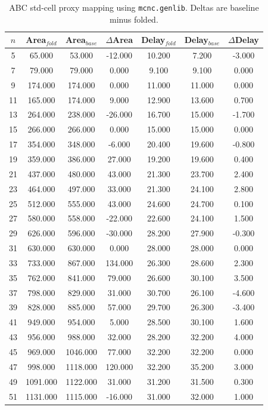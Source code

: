 \begin{table}[t]
\centering
\caption{ABC std-cell proxy mapping using \texttt{mcnc.genlib}. Deltas are baseline minus folded.}
\label{tab:stdcell_mcnc_genlib}
\begin{tabular}{ccccccc}
\hline
$n$ & Area$_{fold}$ & Area$_{base}$ & $\Delta$Area & Delay$_{fold}$ & Delay$_{base}$ & $\Delta$Delay \\
\hline
5 & 65.000 & 53.000 & -12.000 & 10.200 & 7.200 & -3.000 \\
7 & 79.000 & 79.000 & 0.000 & 9.100 & 9.100 & 0.000 \\
9 & 174.000 & 174.000 & 0.000 & 11.000 & 11.000 & 0.000 \\
11 & 165.000 & 174.000 & 9.000 & 12.900 & 13.600 & 0.700 \\
13 & 264.000 & 238.000 & -26.000 & 16.700 & 15.000 & -1.700 \\
15 & 266.000 & 266.000 & 0.000 & 15.000 & 15.000 & 0.000 \\
17 & 354.000 & 348.000 & -6.000 & 20.400 & 19.600 & -0.800 \\
19 & 359.000 & 386.000 & 27.000 & 19.200 & 19.600 & 0.400 \\
21 & 437.000 & 480.000 & 43.000 & 21.300 & 23.700 & 2.400 \\
23 & 464.000 & 497.000 & 33.000 & 21.300 & 24.100 & 2.800 \\
25 & 512.000 & 555.000 & 43.000 & 24.600 & 24.700 & 0.100 \\
27 & 580.000 & 558.000 & -22.000 & 22.600 & 24.100 & 1.500 \\
29 & 626.000 & 596.000 & -30.000 & 28.200 & 27.900 & -0.300 \\
31 & 630.000 & 630.000 & 0.000 & 28.000 & 28.000 & 0.000 \\
33 & 733.000 & 867.000 & 134.000 & 26.300 & 28.600 & 2.300 \\
35 & 762.000 & 841.000 & 79.000 & 26.600 & 30.100 & 3.500 \\
37 & 798.000 & 829.000 & 31.000 & 30.700 & 26.100 & -4.600 \\
39 & 828.000 & 885.000 & 57.000 & 29.700 & 26.300 & -3.400 \\
41 & 949.000 & 954.000 & 5.000 & 28.500 & 30.100 & 1.600 \\
43 & 956.000 & 988.000 & 32.000 & 28.200 & 32.200 & 4.000 \\
45 & 969.000 & 1046.000 & 77.000 & 32.200 & 32.200 & 0.000 \\
47 & 998.000 & 1118.000 & 120.000 & 32.200 & 35.200 & 3.000 \\
49 & 1091.000 & 1122.000 & 31.000 & 31.200 & 31.500 & 0.300 \\
51 & 1131.000 & 1115.000 & -16.000 & 31.000 & 32.000 & 1.000 \\
\hline
\end{tabular}
\end{table}
